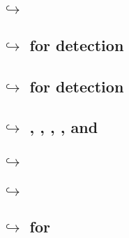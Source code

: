 \subsection{\hubMod{} $\hookrightarrow$ \idMod{}                                                            \lispDone{} } \label{hub: lookups: into instruction decoder}              
\subsection{\hubMod{} $\hookrightarrow$ \wcpMod{} for \suxSH{} detection                                    \lispDone{} } \label{hub: lookups: into wcp for stack underflow}          
\subsection{\hubMod{} $\hookrightarrow$ \wcpMod{} for \soxSH{} detection                                    \lispDone{} } \label{hub: lookups: into wcp for stack overflow}           
\subsection{\hubMod{} $\hookrightarrow$ \addMod{}, \binMod{}, \modMod{}, \mulMod{}, \shfMod{} and \wcpMod{} \lispDone{} } \label{hub: lookups: into the 2 argument stateless modules} 
\subsection{\hubMod{} $\hookrightarrow$ \extMod{}                                                           \lispDone{} } \label{hub: lookups: into ext}                              
\subsection{\hubMod{} $\hookrightarrow$ \btcMod{}                                                           \lispDone{} } \label{hub: lookups: into block data}                       
\subsection{\hubMod{} $\hookrightarrow$ \blockHashMod{} for                                 \lispDone{} } \label{hub: lookups: into block hash for BLOCKHASH opcode}  
